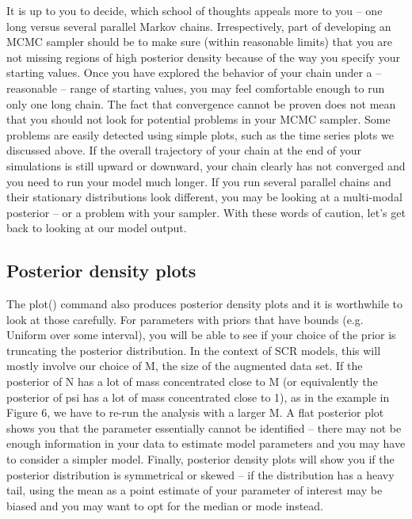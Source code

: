 It is up to you to decide, which school of thoughts appeals more to you – one long versus several parallel Markov chains. Irrespectively, part of developing an MCMC sampler should be to make sure (within reasonable limits) that you are not missing regions of high posterior density because of the way you specify your starting values. Once you have explored the behavior of your chain under a – reasonable – range of starting values, you may feel comfortable enough to run only one long chain.
The fact that convergence cannot be proven does not mean that you should not look for potential problems in your MCMC sampler. Some problems are easily detected using simple plots, such as the time series plots we discussed above. If the overall trajectory of your chain at the end of your simulations is still upward or downward, your chain clearly has not converged and you need to run your model much longer.  If you run several parallel chains and their stationary distributions look different, you may be looking at a multi-modal posterior – or a problem with your sampler. With these words of caution, let's get back to looking at our model output.

\subsection{Posterior density plots}
The plot() command also produces posterior density plots and it is worthwhile to look at those carefully. For parameters with priors that have bounds (e.g. Uniform over some interval), you will be able to see if your choice of the prior is truncating the posterior distribution. In the context of SCR models, this will mostly involve our choice of M, the size of the augmented data set. If the posterior of N has a lot of mass concentrated close to M (or equivalently the posterior of psi has a lot of mass concentrated close to 1), as in the example in Figure 6, we have to re-run the analysis with a larger M.  A flat posterior plot shows you that the parameter essentially cannot be identified – there may not be enough information in your data to estimate model parameters and you may have to consider a simpler model. Finally, posterior density plots will show you if the posterior distribution is symmetrical or skewed – if the distribution has a heavy tail, using the mean as a point estimate of your parameter of interest may be biased and you may want to opt for the median or mode instead.

